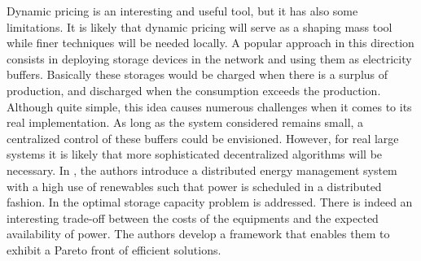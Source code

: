 \documentclass[journal]{IEEEtran}
\begin{document}
Dynamic pricing is an interesting and useful tool, but it has also some limitations. It is likely that dynamic pricing will serve as a shaping mass tool while finer techniques will be needed locally. A popular approach in this direction consists in deploying storage devices in the network and using them as electricity buffers. Basically these storages would be charged when there is a surplus of production, and discharged when the consumption exceeds the production. Although quite simple, this idea causes numerous challenges when it comes to its real implementation. As long as the system considered remains small, a centralized control of these buffers could be envisioned. However, for real large systems it is likely that more sophisticated decentralized algorithms will be necessary. In \cite{Zhang2013}, the authors introduce a distributed energy management system with a high use of renewables such that power is scheduled in a distributed fashion. In \cite{Shadmand2014} the optimal storage capacity problem is addressed. There is indeed an interesting trade-off between the costs of the equipments and the expected availability of power. The authors develop a framework that enables them to exhibit a Pareto front of efficient solutions.
\end{document}
